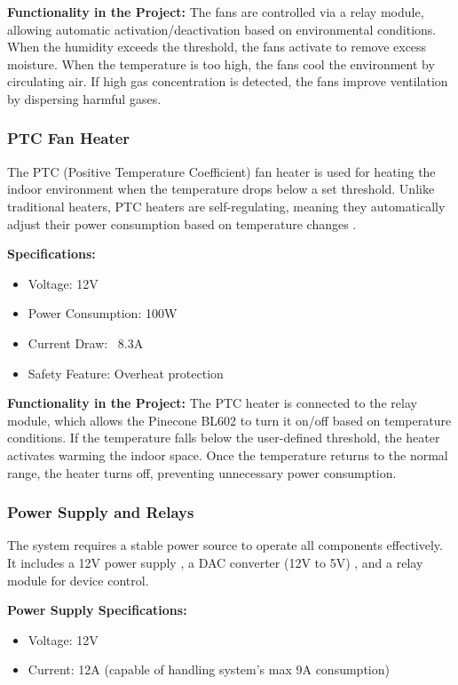 \documentclass[a4paper]{scrartcl}
\begin{document}
\textbf{Functionality in the Project:}
The fans are controlled via a relay module, allowing automatic activation/deactivation based on environmental conditions. When the humidity exceeds the threshold, the fans activate to remove excess moisture. When the temperature is too high, the fans cool the environment by circulating air. If high gas concentration is detected, the fans improve ventilation by dispersing harmful gases.

\subsubsection{PTC Fan Heater}
The PTC (Positive Temperature Coefficient) fan heater is used for heating the indoor environment when the temperature drops below a set threshold. Unlike traditional heaters, PTC heaters are self-regulating, meaning they automatically adjust their power consumption based on temperature changes \cite{r18}.

\textbf{Specifications:}
\begin{itemize}
    \item Voltage: 12V
    \item Power Consumption: 100W
    \item Current Draw: ~8.3A
    \item Safety Feature: Overheat protection
\end{itemize}

\textbf{Functionality in the Project:}
The PTC heater is connected to the relay module, which allows the Pinecone BL602 to turn it on/off based on temperature conditions. If the temperature falls below the user-defined threshold, the heater activates warming the indoor space. Once the temperature returns to the normal range, the heater turns off, preventing unnecessary power consumption.

\subsubsection{Power Supply and Relays}
The system requires a stable power source to operate all components effectively. It includes a 12V power supply \cite{r6}, a DAC converter (12V to 5V) \cite{r7} , and a relay \cite{r5} module for device control.

\textbf{Power Supply Specifications:}
\begin{itemize}
    \item Voltage: 12V
    \item Current: 12A (capable of handling system’s max 9A consumption)
\end{itemize}
\end{document}
